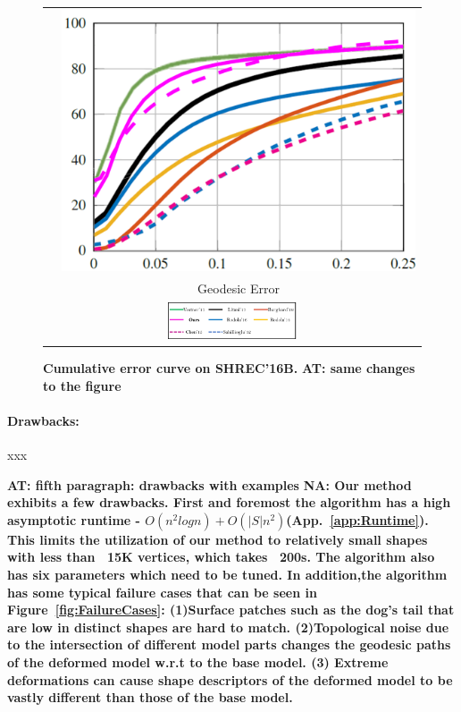 \documentclass[10pt,twocolumn,letterpaper]{article}
\newcommand{\colornote}[3]{{\color{#1}\bf{#2: #3}\normalfont}}
\newcommand{\colornote}[3]{}
\newcommand {\ayellet}[1]{\colornote{blue}{AT}{#1}}
\newcommand {\nadav}[1]{\colornote{red}{NA}{#1}}
\begin{document}
\begin{figure}[htb]

	\centering
\setlength\tabcolsep{0.5pt}
\begin{tabular}{cc}
	\rotatebox{90}{    \, \% Correspondences} &
	\includegraphics[scale=0.3]{figures/SHREC16BCummulative.png}\\
	& Geodesic Error \\
		\multicolumn{2}{c}{\includegraphics[width=0.35\textwidth]{figures/SHREC16Bmethods.png}}
\end{tabular}
	\caption{{\bf Cumulative error curve on SHREC'16B.} \ayellet{same changes to the figure}}
		\label{fig:Shrec16Top}
\end{figure}

\paragraph{Drawbacks:} xxx


\ayellet{fifth paragraph: drawbacks with examples}
\nadav{Our method exhibits a few drawbacks.
    First and foremost the algorithm has a high asymptotic runtime - $O(n^2logn) + O(|S|n^2)$(App.~\ref{app:Runtime}). 
	This limits the utilization of our method to relatively small shapes with less than ~15K vertices, which takes ~200s. 
	The algorithm also has six parameters which need to be tuned. 
	In addition,the algorithm has some typical failure cases that can be seen in Figure~\ref{fig:FailureCases}: 
	(1)Surface patches such as the dog's tail that are low in distinct shapes are hard to match. (2)Topological noise due to the intersection of different model parts changes the geodesic paths of the deformed model w.r.t to the base model.
(3) Extreme deformations can cause shape descriptors of the deformed model to be vastly different than those of the base model.}
\end{document}
